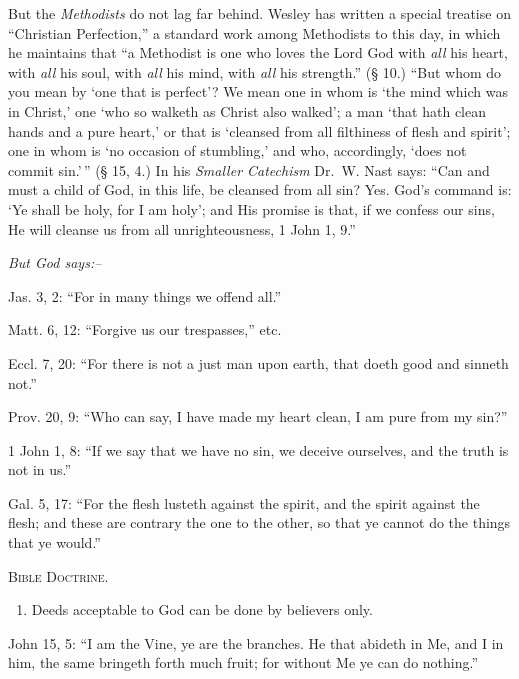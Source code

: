 \documentclass[
]{book}
\providecommand{\tightlist}{%
  \setlength{\itemsep}{0pt}\setlength{\parskip}{0pt}}
\begin{document}
But the \emph{Methodists} do not lag far behind. Wesley has written a special treatise on ``Christian Perfection,'' a standard work among Methodists to this day, in which he maintains that ``a Methodist is one who loves the Lord God with \emph{all} his heart, with \emph{all} his soul, with \emph{all} his mind, with \emph{all} his strength.'' (§ 10.) ``But whom do you mean by `one that is perfect'? We mean one in whom is `the mind which was in Christ,' one `who so walketh as Christ also walked'; a man `that hath clean hands and a pure heart,' or that is `cleansed from all filthiness of flesh and spirit'; one in whom is `no occasion of stumbling,' and who, accordingly, `does not commit sin.'\,'' (§ 15, 4.) In his \emph{Smaller Catechism} Dr.~W. Nast says: ``Can and must a child of God, in this life, be cleansed from all sin? Yes. God's command is: `Ye shall be holy, for I am holy'; and His promise is that, if we confess our sins, He will cleanse us from all unrighteousness, 1 John 1, 9.''

\begin{center}
\textsl{But God says:--}
\end{center}

Jas. 3, 2: ``For in many things we offend all.''

Matt. 6, 12: ``Forgive us our trespasses,'' etc.

Eccl. 7, 20: ``For there is not a just man upon earth, that doeth good and sinneth not.''

Prov. 20, 9: ``Who can say, I have made my heart clean, I am pure from my sin?''

1 John 1, 8: ``If we say that we have no sin, we deceive ourselves, and the truth is not in us.''

Gal. 5, 17: ``For the flesh lusteth against the spirit, and the spirit against the flesh; and these are contrary the one to the other, so that ye cannot do the things that ye would.''

\begin{center}
\textsc{Bible Doctrine.}
\end{center}

\begin{enumerate}
\def\labelenumi{\alph{enumi}.}
\setcounter{enumi}{1}
\tightlist
\item
  Deeds acceptable to God can be done by believers only.
\end{enumerate}

John 15, 5: ``I am the Vine, ye are the branches. He that abideth in Me, and I in him, the same bringeth forth much fruit; for without Me ye can do nothing.''
\end{document}
